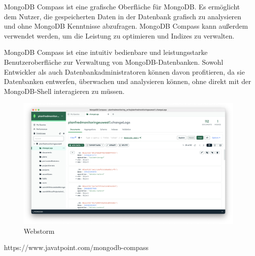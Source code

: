 MongoDB Compass ist eine grafische Oberfläche für MongoDB. Es ermöglicht dem Nutzer, die gespeicherten Daten in der Datenbank grafisch zu analysieren und ohne MongoDB Kenntnisse abzufragen. MongoDB Compass kann außerdem verwendet werden, um die Leistung zu optimieren und Indizes zu verwalten.\newline

MongoDB Compass ist eine intuitiv bedienbare und leistungsstarke Benutzeroberfläche zur Verwaltung von MongoDB-Datenbanken. Sowohl Entwickler als auch Datenbankadministratoren können davon profitieren, da sie Datenbanken entwerfen, überwachen und analysieren können, ohne direkt mit der MongoDB-Shell interagieren zu müssen.

\begin{figure}[h!]
    \centering
    \includegraphics[width=1\linewidth]{pics/mongodb-compass.png}
    \caption{Webstorm}
    \label{fig:enter-label}
\end{figure}
https://www.javatpoint.com/mongodb-compass